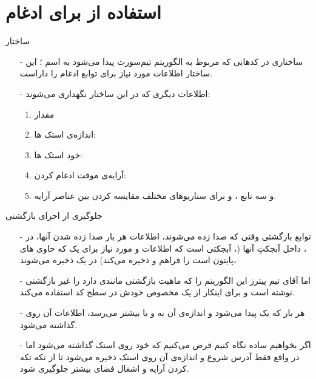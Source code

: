 \section{استفاده از  برای ادغام}
\begin{frame}{ساختار }
\begin{itemize}\itemr
\item[-]
ساختاری در کد‌هایی که مربوط به الگوریتم تیم‌سورت پیدا می‌شود به اسم ؛ این ساختار اطلاعات مورد نیاز برای توابع ادغام را داراست.

\item[-]
اطلاعات دیگری که در این ساختار نگهداری می‌شوند:
\begin{enumerate}\itemr
\item 
مقدار 

\item 
اندازه‌ی استک ها:

\item 
خود استک ها:

\item 
آرایه‌ی موقت ادغام کردن:

\item 
و سه تابع
،
 و
برای سناریو‌های مختلف مقایسه کردن بین عناصر آرایه.
\end{enumerate}
\end{itemize}
\end{frame}

\begin{frame}{جلوگیری از اجرای بازگشتی}
\begin{itemize}\itemr
\item[-]
توابع بازگشتی وقتی که صدا زده می‌شوند، اطلاعات هر بار صدا زده شدن آنها، در
،
داخل آبجکتِ
آنها (، آبجکتی است که اطلاعات و  مورد نیاز برای یک  که حاوی ‌های پایتون است را فراهم و ذخیره می‌کند) در یک  ذخیره می‌شوند،

\item[-]
اما آقای تیم پیترز این الگوریتم را که ماهیت بازگشتی مانندی دارد را غیر بازگشتی نوشته است و برای اینکار از یک  مخصوص خودش در سطح کد استفاده می‌کند.

\item[-]
هر بار که یک  پیدا می‌شود و اندازه‌ی آن به  و یا بیشتر می‌رسد، اطلاعات آن روی  گذاشته می‌شود.

\item[-]
اگر بخواهیم ساده نگاه کنیم فرض می‌کنیم که خود  روی استک گذاشته می‌شود اما در واقع فقط آدرس شروع و اندازه‌ی آن روی استک ذخیره می‌شود تا از تکه تکه کردن آرایه و اشغال فضای بیشتر جلوگیری شود.
\end{itemize}
\end{frame}

